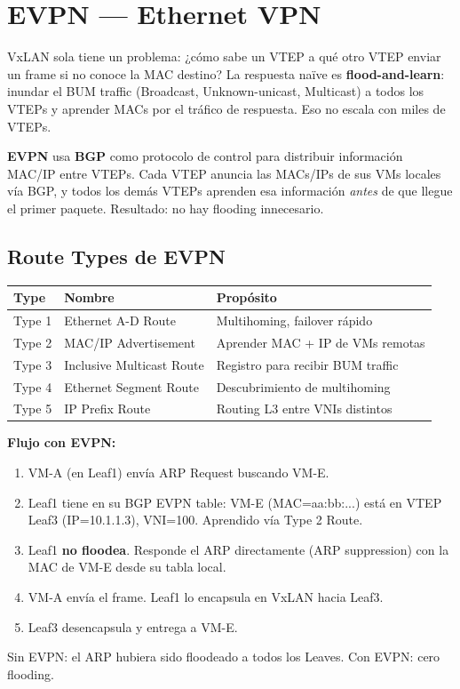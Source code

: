 \section{ EVPN --- Ethernet VPN}

\begin{concepto}
VxLAN sola tiene un problema: ¿cómo sabe un VTEP a qué otro VTEP enviar un frame si
no conoce la MAC destino? La respuesta naïve es \textbf{flood-and-learn}: inundar el
BUM traffic (Broadcast, Unknown-unicast, Multicast) a todos los VTEPs y aprender MACs
por el tráfico de respuesta. Eso no escala con miles de VTEPs.

\textbf{EVPN} usa \textbf{BGP} como protocolo de control para distribuir información
MAC/IP entre VTEPs. Cada VTEP anuncia las MACs/IPs de sus VMs locales vía BGP, y todos
los demás VTEPs aprenden esa información \emph{antes} de que llegue el primer paquete.
Resultado: no hay flooding innecesario.
\end{concepto}

\subsection{Route Types de EVPN}

\begin{center}
\begin{tabular}{lll}
\toprule
\textbf{Type} & \textbf{Nombre} & \textbf{Propósito} \\
\midrule
Type 1 & Ethernet A-D Route        & Multihoming, failover rápido \\
Type 2 & MAC/IP Advertisement      & Aprender MAC + IP de VMs remotas \\
Type 3 & Inclusive Multicast Route & Registro para recibir BUM traffic \\
Type 4 & Ethernet Segment Route    & Descubrimiento de multihoming \\
Type 5 & IP Prefix Route           & Routing L3 entre VNIs distintos \\
\bottomrule
\end{tabular}
\end{center}

\begin{ejemplo}
\textbf{Flujo con EVPN:}
\begin{enumerate}
    \item VM-A (en Leaf1) envía ARP Request buscando VM-E.
    \item Leaf1 tiene en su BGP EVPN table: VM-E (MAC=aa:bb:...) está en VTEP Leaf3
          (IP=10.1.1.3), VNI=100. Aprendido vía Type 2 Route.
    \item Leaf1 \textbf{no floodea}. Responde el ARP directamente (ARP suppression)
          con la MAC de VM-E desde su tabla local.
    \item VM-A envía el frame. Leaf1 lo encapsula en VxLAN hacia Leaf3.
    \item Leaf3 desencapsula y entrega a VM-E.
\end{enumerate}
Sin EVPN: el ARP hubiera sido floodeado a todos los Leaves. Con EVPN: cero flooding.
\end{ejemplo}

